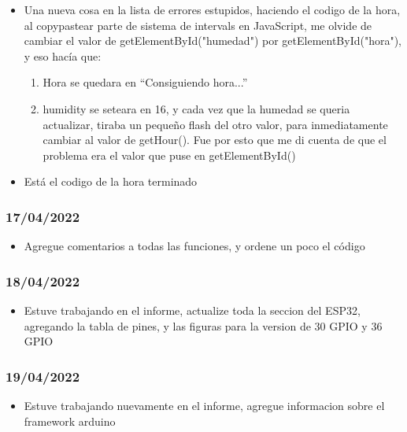 \documentclass[../informe_krapp.tex]{subfiles}
\begin{document}
\begin{itemize}
	\item Una nueva cosa en la lista de errores estupidos, haciendo el codigo de la hora,
	      al copypastear parte de sistema de intervals en JavaScript, me olvide de cambiar el valor de getElementById("humedad") por getElementById("hora"), y eso
	      hacía que:
	      \begin{enumerate}
		      \item Hora se quedara en ``Consiguiendo hora...''
		      \item humidity se seteara en 16, y cada vez que la humedad se queria actualizar,
		            tiraba un pequeño flash del otro valor, para inmediatamente cambiar
		            al valor de getHour(). Fue por esto que me di cuenta de que el
		            problema era el valor que puse en getElementById()
	      \end{enumerate}
	\item Está el codigo de la hora terminado
\end{itemize}

\subsubsection{17/04/2022}
\begin{itemize}
	\item Agregue comentarios a todas las funciones, y ordene un poco el código
\end{itemize}

\subsubsection{18/04/2022}
\begin{itemize}
	\item Estuve trabajando en el informe, actualize toda la seccion del ESP32, agregando
	      la tabla de pines, y las figuras para la version de 30 GPIO y 36 GPIO
\end{itemize}

\subsubsection{19/04/2022}
\begin{itemize}
	\item Estuve trabajando nuevamente en el informe, agregue informacion sobre el framework
	      arduino
\end{itemize}
\end{document}
